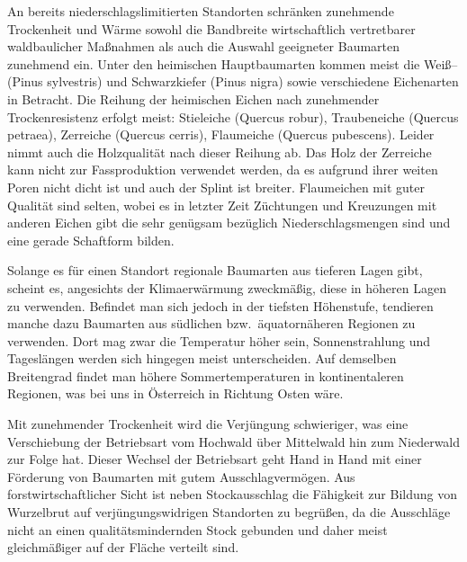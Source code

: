 \documentclass[twocolumn]{scrartcl}
\begin{document}
An bereits niederschlagslimitierten Standorten schränken zunehmende Trockenheit
und Wärme sowohl die Bandbreite wirtschaftlich vertretbarer waldbaulicher
Maßnahmen als auch die Auswahl geeigneter Baumarten zunehmend ein. Unter den
heimischen Hauptbaumarten kommen meist die Weiß-- (Pinus sylvestris) und
Schwarzkiefer (Pinus nigra) sowie verschiedene Eichenarten in Betracht. Die
Reihung der heimischen Eichen nach zunehmender Trockenresistenz erfolgt meist:
Stieleiche (Quercus robur), Traubeneiche (Quercus petraea), Zerreiche (Quercus
cerris), Flaumeiche (Quercus pubescens). Leider nimmt auch die Holzqualität nach
dieser Reihung ab. Das Holz der Zerreiche kann nicht zur Fassproduktion
verwendet werden, da es aufgrund ihrer weiten Poren nicht dicht ist und auch der
Splint ist breiter. Flaumeichen mit guter Qualität sind selten, wobei es in
letzter Zeit Züchtungen und Kreuzungen mit anderen Eichen gibt die sehr genügsam
bezüglich Niederschlagsmengen sind und eine gerade Schaftform bilden.

Solange es für einen Standort regionale Baumarten aus tieferen Lagen gibt,
scheint es, angesichts der Klimaerwärmung zweckmäßig, diese in höheren Lagen zu
verwenden. Befindet man sich jedoch in der tiefsten Höhenstufe, tendieren manche
dazu Baumarten aus südlichen bzw.\ äquatornäheren Regionen zu verwenden. Dort
mag zwar die Temperatur höher sein, Sonnenstrahlung und Tageslängen werden sich
hingegen meist unterscheiden. Auf demselben Breitengrad findet man höhere
Sommertemperaturen in kontinentaleren Regionen, was bei uns in Österreich in
Richtung Osten wäre.

Mit zunehmender Trockenheit wird die Verjüngung schwieriger, was eine
Verschiebung der Betriebsart vom Hochwald über Mittelwald hin zum Niederwald zur
Folge hat. Dieser Wechsel der Betriebsart geht Hand in Hand mit einer Förderung
von Baumarten mit gutem Ausschlagvermögen. Aus forstwirtschaftlicher Sicht ist
neben Stockausschlag die Fähigkeit zur Bildung von Wurzelbrut auf
verjüngungswidrigen Standorten zu begrüßen, da die Ausschläge nicht an einen
qualitätsmindernden Stock gebunden und daher meist gleichmäßiger auf der Fläche
verteilt sind.
\end{document}

